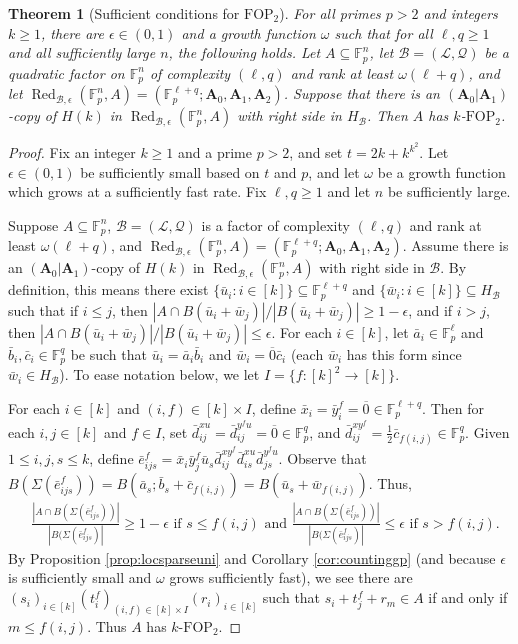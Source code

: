 \documentclass[12pt,oneside,british,a4wide]{amsart}
\newtheorem{theorem}{Theorem}[section]
\numberwithin{equation}{section}
\theoremstyle{definition}
\def\F{\mathbb{F}}
\def\FOP{\mathrm{FOP}}
\def\e{\epsilon}
\newcommand{\abar}{\bar{a}}
\newcommand{\bbar}{\bar{b}}
\newcommand{\cbar}{\bar{c}}
\newcommand{\dbar}{\bar{d}}
\newcommand{\ebar}{\bar{e}}
\newcommand{\ubar}{\bar{u}}
\newcommand{\wbar}{\bar{w}}
\newcommand{\xbar}{\bar{x}}
\newcommand{\ybar}{\bar{y}}
\newcommand{\calL}{\mathcal{L}}
\newcommand{\calB}{\mathcal{B}}
\newcommand{\calQ}{\mathcal{Q}}
\newcommand{\Red}{{\mathrm{Red}}}
\def\Red{\operatorname{Red}}
\begin{document}
\begin{theorem}[Sufficient conditions for $\FOP_2$]\label{thm:extract2}
For all primes $p>2$ and integers $k\geq 1$,  there are $\e\in (0,1)$ and a growth function $\omega$ such that for all $\ell, q\geq 1$ and all sufficiently large $n$,  the following holds.  Let $A\subseteq \mathbb{F}_p^n$, let $\calB=(\calL,\calQ)$ be a quadratic factor on $\F_p^n$ of complexity $(\ell,q)$ and rank at least $\omega(\ell+q)$, and let $\Red_{\calB,\e}(\F_p^n,A)=(\F_p^{\ell+q};\mathbf{A}_0,\mathbf{A}_1,\mathbf{A}_2)$.  Suppose that there is an $(\mathbf{A}_0|\mathbf{A}_1)$-copy of $H(k)$ in $\Red_{\calB,\e}(\F_p^n,A)$ with right side in $H_{\calB}$. Then $A$ has $k$-$\FOP_2$.
\end{theorem}
\begin{proof}
Fix an integer $k\geq 1$ and a prime $p>2$, and set $t=2k+k^{k^2}$. Let $\e\in (0,1)$ be sufficiently small based on $t$ and $p$, and let $\omega$ be a growth function which grows at a sufficiently fast rate. Fix $\ell,q\geq 1$ and let $n$ be sufficiently large.  

Suppose $A\subseteq \mathbb{F}_p^n$, $\calB=(\calL,\calQ)$ is a factor of complexity $(\ell,q)$ and rank at least $\omega(\ell+q)$, and $\Red_{\calB,\e}(\F_p^n,A)=(\F_p^{\ell+q};\mathbf{A}_0,\mathbf{A}_1,\mathbf{A}_2)$.  Assume there is an $(\mathbf{A}_0|\mathbf{A}_1)$-copy of $H(k)$ in $\Red_{\calB,\e}(\F_p^n,A)$ with right side in $\calB$.  By definition, this means there exist $\{\ubar_i : i\in [k]\}\subseteq  \mathbb{F}_p^{\ell+q}$ and $\{\wbar_i: i\in [k]\}\subseteq H_{\calB}$ such that if $i\leq j$, then $|A\cap B(\ubar_i+\wbar_j)|/|B(\ubar_i+\wbar_j)|\geq 1-\e$, and if $i>j$, then $|A\cap B(\ubar_i+\wbar_j)|/|B(\ubar_i+\wbar_j)|\leq \e$.  For each $i\in [k]$, let $\abar_i\in \F_p^{\ell}$ and $\bbar_i,\cbar_i\in \F_p^q$ be such that $\ubar_i=\abar_i\bbar_i$ and $\wbar_i=\overline{0}\cbar_i$ (each $\wbar_i$ has this form since $\wbar_i\in H_{\calB}$).  To ease notation below, we let $I=\{f: [k]^2\rightarrow [k]\}$.


For each $i\in [k]$ and $(i,f)\in [k]\times I$, define $ \xbar_i=\ybar_i^f=\overline{0}\in \F_p^{\ell+q}$.  Then for each $i,j\in [k]$ and $f\in I$, set $\dbar_{ij}^{xu}=\dbar_{ij}^{y^fu}=\overline{0}\in \mathbb{F}_p^q$, and $\dbar_{ij}^{xy^f}=\frac{1}{2}\cbar_{f(i,j)}\in \mathbb{F}_p^q$.  Given $1\leq i,j,s\leq k$, define $\ebar_{ijs}^{f}=\xbar_i\ybar^f_j\ubar_s\dbar_{ij}^{xy^f}\dbar_{is}^{xu}\dbar_{js}^{y^fu}$.  Observe that $B(\Sigma(\ebar^f_{ijs}))=B(\abar_s; \bbar_s+\cbar_{f(i,j)})=B(\ubar_s+\wbar_{f(i,j)})$.  Thus,
\begin{align*}
&\frac{|A\cap B(\Sigma(\ebar^f_{ijs}))|}{|B(\Sigma(\ebar^f_{ijs})|}\geq 1-\e\text{ if }s\leq  f(i,j)\text{ and }\frac{|A\cap B(\Sigma(\ebar^f_{ijs}))|}{|B(\Sigma(\ebar^f_{ijs})|}\leq \e\text{ if }s>f(i,j).
\end{align*}
By Proposition \ref{prop:locsparseuni} and Corollary \ref{cor:countinggp} (and because $\e$ is sufficiently small and $\omega$ grows sufficiently fast),   we see there are $(s_i)_{i\in [k]}(t_i^f)_{(i,f)\in [k]\times I}(r_i)_{i\in [k]}$  such that $s_i+t_j^f+r_m\in A$ if and only if $m\leq f(i,j)$.  Thus $A$ has $k$-$\FOP_2$. 
\end{proof}
\end{document}
